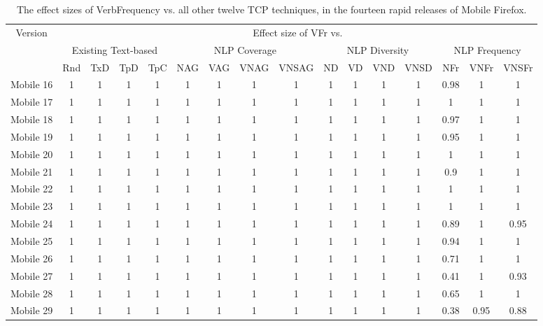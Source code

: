 \documentclass[conference]{IEEEtran}
\begin{document}
\begin{table*}[t!]
\centering
\caption{The effect sizes of VerbFrequency vs. all other twelve TCP techniques, in the fourteen rapid releases of Mobile Firefox.}
\label{table:6}
\begin{tabular}{ |c|c c c c|c c c c|c c c c|c c c|}
\hline
\multirow{3}{*}{Version} &
\multicolumn{15}{|c|}{Effect size of VFr vs.} \\
\cline{2-16}
\multicolumn{1}{|c}{} & 
\multicolumn{4}{|c}{Existing Text-based} & \multicolumn{4}{|c}{NLP Coverage}& \multicolumn{4}{|c}{NLP Diversity} &
\multicolumn{3}{|c|}{NLP Frequency}\\
\cline{2-16}
&    Rnd                 & TxD   & TpD   & TpC   & NAG          & VAG   & VNAG  & VNSAG & ND            & VD    & VND   & VNSD  & NFr           &  VNFr  & VNSFr \\
\hline
Mobile 16 & 1 & 1 & 1 & 1 & 1 & 1 & 1 & 1 & 1 & 1 & 1 & 1 & 0.98 & 1    & 1    \\
Mobile 17 & 1 & 1 & 1 & 1 & 1 & 1 & 1 & 1 & 1 & 1 & 1 & 1 & 1    & 1    & 1    \\
Mobile 18 & 1 & 1 & 1 & 1 & 1 & 1 & 1 & 1 & 1 & 1 & 1 & 1 & 0.97 & 1    & 1    \\
Mobile 19 & 1 & 1 & 1 & 1 & 1 & 1 & 1 & 1 & 1 & 1 & 1 & 1 & 0.95 & 1    & 1    \\
Mobile 20 & 1 & 1 & 1 & 1 & 1 & 1 & 1 & 1 & 1 & 1 & 1 & 1 & 1    & 1    & 1    \\
Mobile 21 & 1 & 1 & 1 & 1 & 1 & 1 & 1 & 1 & 1 & 1 & 1 & 1 & 0.9  & 1    & 1    \\
Mobile 22 & 1 & 1 & 1 & 1 & 1 & 1 & 1 & 1 & 1 & 1 & 1 & 1 & 1    & 1    & 1    \\
Mobile 23 & 1 & 1 & 1 & 1 & 1 & 1 & 1 & 1 & 1 & 1 & 1 & 1 & 1    & 1    & 1    \\
Mobile 24 & 1 & 1 & 1 & 1 & 1 & 1 & 1 & 1 & 1 & 1 & 1 & 1 & 0.89 & 1    & 0.95 \\
Mobile 25 & 1 & 1 & 1 & 1 & 1 & 1 & 1 & 1 & 1 & 1 & 1 & 1 & 0.94 & 1    & 1    \\
Mobile 26 & 1 & 1 & 1 & 1 & 1 & 1 & 1 & 1 & 1 & 1 & 1 & 1 & 0.71 & 1    & 1    \\
Mobile 27 & 1 & 1 & 1 & 1 & 1 & 1 & 1 & 1 & 1 & 1 & 1 & 1 & 0.41 & 1    & 0.93 \\
Mobile 28 & 1 & 1 & 1 & 1 & 1 & 1 & 1 & 1 & 1 & 1 & 1 & 1 & 0.65 & 1    & 1    \\
Mobile 29 & 1 & 1 & 1 & 1 & 1 & 1 & 1 & 1 & 1 & 1 & 1 & 1 & 0.38 & 0.95 & 0.88 \\

\hline
\end{tabular}
\end{table*}
\end{document}
